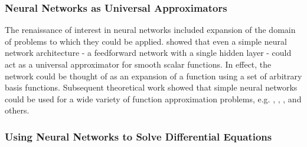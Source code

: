 \documentclass{article}
\begin{document}
\subsubsection{Neural Networks as Universal Approximators}

The renaissance of interest in neural networks included expansion of the domain of problems to which they could be applied. \cite{Hornik1989} showed that even a simple neural network architecture - a feedforward network with a single hidden layer - could act as a universal approximator for smooth scalar functions. In effect, the network could be thought of as an expansion of a function using a set of arbitrary basis functions. Subsequent theoretical work showed that simple neural networks could be used for a wide variety of function approximation problems, e.g. \cite{Blum1991}, \cite{Cardaliaguet1992}, \cite{Webb1994}, and others.

\subsubsection{Using Neural Networks to Solve Differential Equations}
\end{document}
